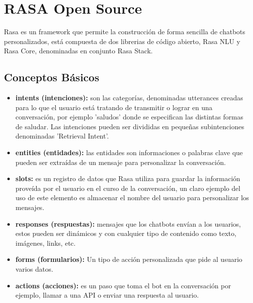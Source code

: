 \chapter[RASA]{RASA Open Source}
Rasa es un framework que permite la construcción de forma sencilla de chatbots personalizados, está
compuesta de dos librerias de código abierto, Rasa NLU y Rasa Core, denominadas en conjunto Rasa
Stack.
\indent
\section{Conceptos Básicos}
\begin{itemize}
	\item \textbf{intents (intenciones): }son las categorías, denominadas utterances creadas para
	      lo que el usuario está tratando de transmitir o lograr en una conversación, por ejemplo 'saludos'
	      donde se especifican las distintas formas de saludar. Las intenciones pueden ser divididas en
	      pequeñas subintenciones denominadas 'Retrieval Intent'.
	\item \textbf{entities (entidades): } las entidades son informaciones o palabras clave que
	      pueden ser extraídas de un mensaje para personalizar la conversación.
	\item \textbf{slots:} es un registro de datos que Rasa utiliza para guardar la información
	      proveída por el usuario en el curso de la conversación, un claro ejemplo del uso de este elemento
	      es almacenar el nombre del usuario para personalizar los mensajes.
	\item \textbf{responses (respuestas):} mensajes que los chatbots envían a los usuarios, estos
	      pueden ser dinámicos y con cualquier tipo de contenido como texto, imágenes, links, etc.
	\item \textbf{forms (formularios):} Un tipo de acción personalizada que pide al usuario varios
	      datos.
	\item \textbf{actions (acciones):} es un paso que toma el bot en la conversación por ejemplo,
	      llamar a una API o enviar una respuesta al usuario.\cite{Glossary}
\end{itemize}

